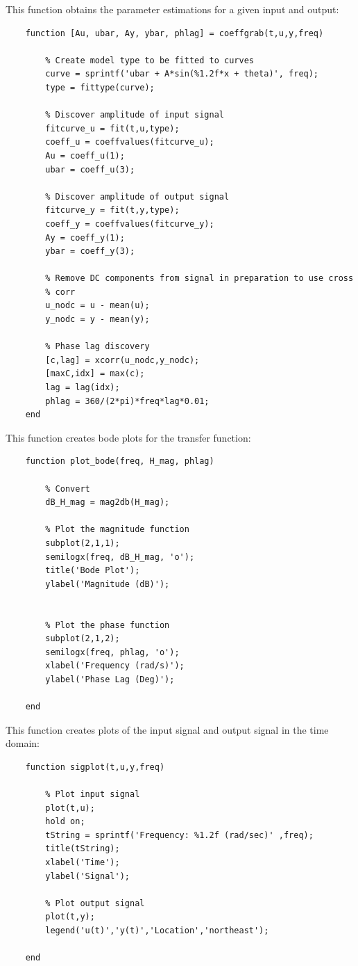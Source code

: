 \documentclass{article}
\begin{document}
\newpage
This function obtains the parameter estimations for a given input and output:
\begin{lstlisting}
	function [Au, ubar, Ay, ybar, phlag] = coeffgrab(t,u,y,freq)
	
		% Create model type to be fitted to curves
		curve = sprintf('ubar + A*sin(%1.2f*x + theta)', freq);
		type = fittype(curve);
	
		% Discover amplitude of input signal
		fitcurve_u = fit(t,u,type);
		coeff_u = coeffvalues(fitcurve_u);
		Au = coeff_u(1);
		ubar = coeff_u(3);
	
		% Discover amplitude of output signal
		fitcurve_y = fit(t,y,type);
		coeff_y = coeffvalues(fitcurve_y);
		Ay = coeff_y(1);
		ybar = coeff_y(3);
	
		% Remove DC components from signal in preparation to use cross
		% corr
		u_nodc = u - mean(u);
		y_nodc = y - mean(y);
	
		% Phase lag discovery
		[c,lag] = xcorr(u_nodc,y_nodc);
		[maxC,idx] = max(c);
		lag = lag(idx);
		phlag = 360/(2*pi)*freq*lag*0.01;
	end
\end{lstlisting}

This function creates bode plots for the transfer function:
\begin{lstlisting}
	function plot_bode(freq, H_mag, phlag)
	
		% Convert
		dB_H_mag = mag2db(H_mag);
	
		% Plot the magnitude function
		subplot(2,1,1);
		semilogx(freq, dB_H_mag, 'o');
		title('Bode Plot');
		ylabel('Magnitude (dB)');
	
	
		% Plot the phase function
		subplot(2,1,2);
		semilogx(freq, phlag, 'o');
		xlabel('Frequency (rad/s)');
		ylabel('Phase Lag (Deg)');
	
	end
\end{lstlisting}

\vspace{1cm}
This function creates plots of the input signal and output signal in the time domain:
\begin{lstlisting}
	function sigplot(t,u,y,freq)
	
		% Plot input signal
		plot(t,u);
		hold on;
		tString = sprintf('Frequency: %1.2f (rad/sec)' ,freq);
		title(tString);
		xlabel('Time');
		ylabel('Signal');
	
		% Plot output signal
		plot(t,y);
		legend('u(t)','y(t)','Location','northeast');
	
	end
\end{lstlisting}
\end{document}
